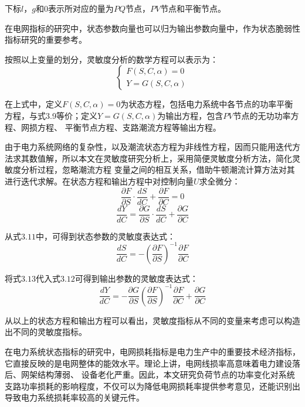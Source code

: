 下标$l$，$g$和$0$表示所对应的量为$PQ$节点，$PV$节点和平衡节点。

在电网指标的研究中，状态参数向量也可以归为输出参数向量中，作为状态脆弱性指标研究的重要参考。

按照以上变量的划分，灵敏度分析的数学方程可以表示为：
\begin{equation}
\left\{\begin{array}{l}{F(S, C, \alpha)=0} \\ {Y=G(S, C, \alpha)}\end{array}\right.
\end{equation}

在上式中，定义$F(S, C, \alpha)=0$为状态方程，包括电力系统中各节点的功率平衡方程，与式3.9等价；定义$Y=G(S, C, \alpha)$为输出方程，包含$PV$节点的无功功率方程、网损方程、
平衡节点方程、支路潮流方程等输出方程。

由于电力系统网络的复杂性，以及潮流状态方程为非线性方程，因而只能用迭代方法求其数值解，所以本文在灵敏度研究分析上，采用简便灵敏度分析方法，简化灵敏度分析过程，忽略潮流方程
变量之间的相互关系，借助牛顿潮流计算方法对其进行迭代求解。在状态方程和输出方程中对控制向量$U$求全微分：
\begin{equation}
  \frac{\partial F}{\partial S} \cdot \frac{d S}{d C}+\frac{\partial F}{\partial C}=0
  \end{equation}
\begin{equation}
  \frac{d Y}{d C}=\frac{\partial G}{\partial S} \cdot \frac{d S}{d C}+\frac{\partial G}{\partial C}
  \end{equation}

从式$3.11$中，可得到状态参数的灵敏度表达式：
\begin{equation}
  \frac{d S}{d C}=-\left(\frac{\partial F}{\partial S}\right)^{-1} \frac{\partial F}{\partial C}
  \end{equation}
  
将式$3.13$代入式$3.12$可得到输出参数的灵敏度表达式：
\begin{equation}
  \frac{d Y}{d C}=-\frac{\partial G}{\partial S}\left(\frac{\partial F}{\partial S}\right)^{-1} \frac{\partial F}{\partial C}+\frac{\partial G}{\partial C}
  \end{equation}

从以上的状态方程和输出方程可以看出，灵敏度指标从不同的变量来考虑可以构造出不同的灵敏度指标。

在电力系统状态指标的研究中，电网损耗指标是电力生产中的重要技术经济指标，它直接反映的是电网整体的能效水平。理论上讲，电网线损率高意味着电力建设落后、网架结构薄弱、
设备老化严重。因此，本文研究负荷节点的功率变化对系统支路功率损耗的影响程度，不仅可以为降低电网损耗率提供参考意见，还能识别出导致电力系统损耗率较高的关键元件。

